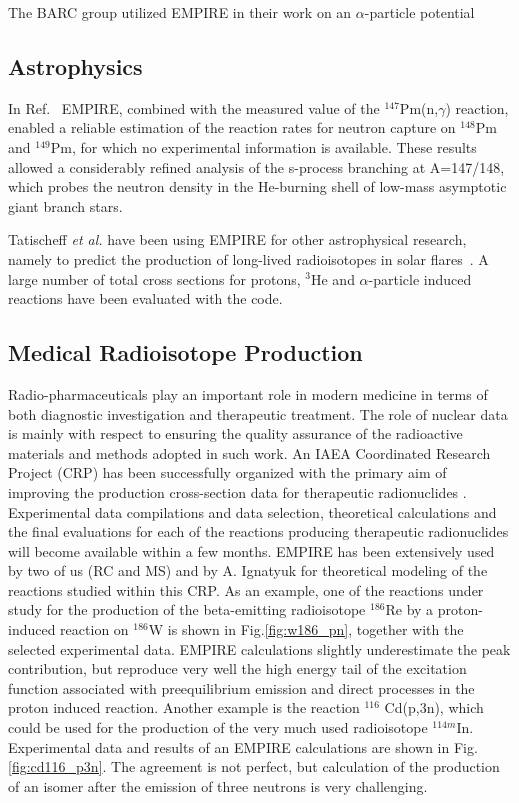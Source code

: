 The BARC group utilized EMPIRE in their work on an $\alpha$-particle
potential~\cite{Kumar:06}

\subsection{Astrophysics}

In Ref.~\cite{reifarth2003snc} EMPIRE, combined with the measured value of
the $^{147}$Pm(n,$\gamma$) reaction, enabled a reliable estimation of the
reaction rates for neutron capture on $^{148}$Pm and $^{149}$Pm, for which
no experimental information is available. These results allowed a
considerably refined analysis of the s-process branching at A=147/148,
which probes the neutron density in the He-burning shell of low-mass
asymptotic giant branch stars.

Tatischeff \textit{et al.} have been using EMPIRE for other astrophysical
research, namely to predict the production of long-lived radioisotopes in
solar flares~\cite{Tatischeff:06}. A large number of total cross sections
for protons, $^3$He and $\alpha$-particle induced reactions have been
evaluated with the code.

\subsection{Medical Radioisotope Production}

Radio-pharmaceuticals play an important role in modern medicine in terms of
both diagnostic investigation and therapeutic treatment. The role of
nuclear data is mainly with respect to ensuring the quality assurance of the
radioactive materials and methods adopted in such work. An IAEA Coordinated
Research Project (CRP) has been successfully organized with the primary aim
of improving the production cross-section data for therapeutic radionuclides
\cite{INDC_NDS_501}. Experimental data compilations and data selection,
theoretical calculations and the final evaluations for each of the reactions
producing therapeutic radionuclides will become available within a few
months. EMPIRE has been extensively used by two of us (RC and MS) and by A.
Ignatyuk for theoretical modeling of the reactions studied within this CRP.
As an example, one of the reactions under study for the production of the
beta-emitting radioisotope $^{186}$Re by a proton-induced reaction on $%
^{186} $W is shown in Fig.\ref{fig:w186_pn}, together with the selected
experimental data. EMPIRE calculations slightly underestimate the peak
contribution, but reproduce very well the high energy tail of the excitation
function associated with preequilibrium emission and direct processes in
the proton induced reaction. Another example is the reaction $^{116}$%
Cd(p,3n), which could be used for the production of the very much used
radioisotope $^{114m}$In. Experimental data and results of an EMPIRE
calculations are shown in Fig.\ref{fig:cd116_p3n}. The agreement is not perfect,
but calculation of the production of an isomer after the emission
of three neutrons is very challenging.

